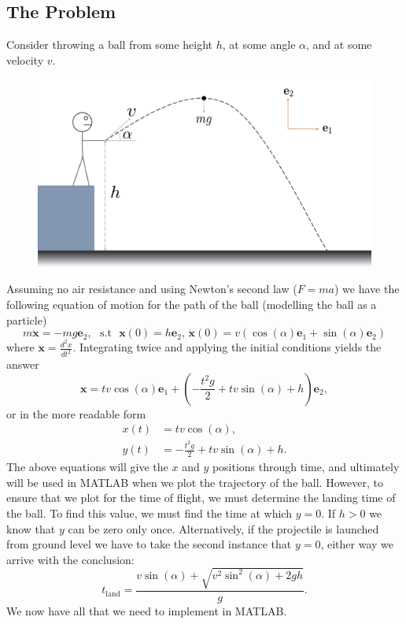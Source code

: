 \documentclass[12pt]{report}
\def\*#1{\mathbf{#1}}
\begin{document}
\subsection*{The Problem}
Consider throwing a ball from some height $h$, at some angle $\alpha$, and at some velocity $v$.\\
\begin{figure}[H]
\includegraphics[width = \textwidth]{Projectile.pdf}
\end{figure}
\noindent Assuming no air resistance and using Newton's second law ($F=ma$) we have the following equation of motion for the path of the ball (modelling the ball as a particle)
\begin{equation*}
m\ddot{\*x} = -mg\*e_2,\,\, \text{ s.t }\,\, \*x(0) = h\*e_2, \, \dot{\*x}(0) = v\left(\cos(\alpha)\*e_1+\sin(\alpha)\*e_2\right)
\end{equation*} 
where $\displaystyle \ddot{\*x} = \frac{d^2x}{dt^2}$. Integrating twice and applying the initial conditions yields the answer
\begin{equation*}
\*x = tv\cos(\alpha)\*e_1+\left(-\frac{t^2 g}{2}+tv\sin(\alpha)+h\right)\*e_2,
\end{equation*}
or in the more readable form
\begin{align}
x(t) &= tv\cos(\alpha),\label{EqMot1}\\
y(t) &= -\frac{t^2 g}{2}+tv\sin(\alpha)+h.\label{EqMot2}
\end{align}
The above equations will give the $x$ and $y$ positions through time, and ultimately will be used in MATLAB when we plot the trajectory of the ball. However, to ensure that we plot for the time of flight, we must determine the landing time of the ball. To find this value, we must find the time at which $y = 0$. If $h>0$ we know that $y$ can be zero only once. Alternatively, if the projectile is launched from ground level we have to take the second instance that $y=0$, either way we arrive with the conclusion:
\begin{equation}\label{TimeLand}
t_{\text{land}} = \frac{v\sin(\alpha)+\sqrt{v^2\sin^2(\alpha)+2gh}}{g}.
\end{equation}
We now have all that we need to implement in MATLAB.
\end{document}
